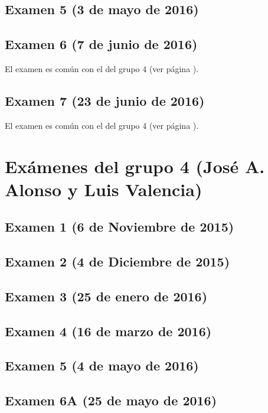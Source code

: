 \documentclass[a4paper,12pt,twoside]{book}
\begin{document}
\subsection{Examen 5 (3 de mayo de 2016)}
\subsection{Examen 6 (7 de junio de 2016)} 
El examen es común con el del grupo 4 (ver página \pageref{examen_15_16_4_6}).
\subsection{Examen 7 (23 de junio de 2016)}
El examen es común con el del grupo 4 (ver página \pageref{examen_15_16_4_7}).

\section{Exámenes del grupo 4 (José A. Alonso y Luis Valencia)}
\subsection{Examen 1 (6 de Noviembre de 2015)}
\subsection{Examen 2 (4 de Diciembre de 2015)}
\subsection{Examen 3 (25 de enero de 2016)}
 \label{examen_15_16_4_3}
\subsection{Examen 4 (16 de marzo de 2016)}
\subsection{Examen 5 (4 de mayo de 2016)}
\subsection{Examen 6A (25 de mayo de 2016)}
\end{document}
